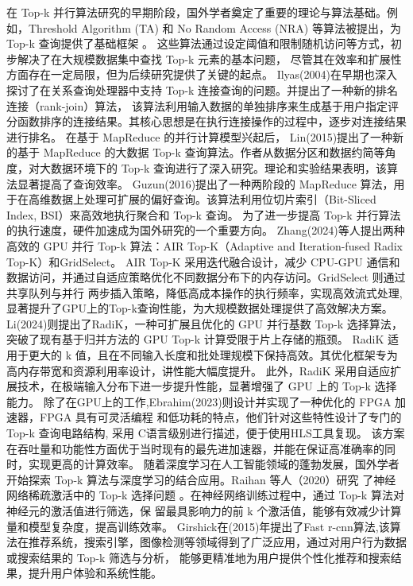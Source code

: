 在 Top-k 并行算法研究的早期阶段，国外学者奠定了重要的理论与算法基础。例如，Threshold Algorithm (TA) 和 No Random Access 
(NRA) 等算法被提出，为 Top-k 查询提供了基础框架 \cite {fagin2001optimal}。
这些算法通过设定阈值和限制随机访问等方式，初步解决了在大规模数据集中查找 Top-k 元素的基本问题，
尽管其在效率和扩展性方面存在一定局限，但为后续研究提供了关键的起点。
Ilyas(2004)在早期也深入探讨了在关系查询处理器中支持 Top-k 连接查询的问题\cite{ilyas2004supporting}。并提出了一种新的排名连接（rank-join）算法，
该算法利用输入数据的单独排序来生成基于用户指定评分函数排序的连接结果。其核心思想是在执行连接操作的过程中，逐步对连接结果进行排名。
在基于 MapReduce 的并行计算模型兴起后，
Lin(2015)提出了一种新的基于 MapReduce 的大数据 Top-k 查询算法\cite{lin2015top}。作者从数据分区和数据约简等角度，对大数据环境下的 Top-k 查询进行了深入研究。理论和实验结果表明，该算法显著提高了查询效率。
Guzun(2016)提出了一种两阶段的 MapReduce 算法\cite{guzun2016two}，用于在高维数据上处理可扩展的偏好查询。该算法利用位切片索引（Bit-Sliced Index, BSI）来高效地执行聚合和 Top-k 查询。
为了进一步提高 Top-k 并行算法的执行速度，硬件加速成为国外研究的一个重要方向。
Zhang(2024)等人提出两种高效的 GPU 并行 Top-k 算法：AIR Top-K（Adaptive and Iteration-fused Radix Top-K）和GridSelect\cite{zhang2023parallel}。
AIR Top-K 采用迭代融合设计，减少 CPU-GPU 通信和数据访问，并通过自适应策略优化不同数据分布下的内存访问。GridSelect 则通过共享队列与并行
两步插入策略，降低高成本操作的执行频率，实现高效流式处理,显著提升了GPU上的Top-k查询性能，为大规模数据处理提供了高效解决方案。
Li(2024)则提出了RadiK，一种可扩展且优化的 GPU 并行基数 Top-k 选择算法\cite{li2024radik}，突破了现有基于归并方法的 GPU Top-k 计算受限于片上存储的瓶颈。
RadiK 适用于更大的 k 值，且在不同输入长度和批处理规模下保持高效。其优化框架专为高内存带宽和资源利用率设计，讲性能大幅度提升。
此外，RadiK 采用自适应扩展技术，在极端输入分布下进一步提升性能，显著增强了 GPU 上的 Top-k 选择能力。
除了在GPU上的工作,Ebrahim(2023)则设计并实现了一种优化的 FPGA 加速器，FPGA 具有可灵活编程
和低功耗的特点，他们针对这些特性设计了专门的 Top-k 查询电路结构\cite{ebrahim2023finding}, 采用 C语言级别进行描述，便于使用HLS工具复现。
该方案在吞吐量和功能性方面优于当时现有的最先进加速器，并能在保证高准确率的同时，实现更高的计算效率。
随着深度学习在人工智能领域的蓬勃发展，国外学者开始探索 Top-k 算法与深度学习的结合应用。Raihan 等人（2020）研究
了神经网络稀疏激活中的 Top-k 选择问题 \cite {raihan2020sparse}。在神经网络训练过程中，通过 Top-k 算法对神经元的激活值进行筛选，保
留最具影响力的前 k 个激活值，能够有效减少计算量和模型复杂度，提高训练效率。
Girshick在(2015)年提出了Fast r-cnn算法,该算法在推荐系统，搜索引擎，图像检测等领域得到了广泛应用，通过对用户行为数据或搜索结果的 Top-k 筛选与分析，
能够更精准地为用户提供个性化推荐和搜索结果，提升用户体验和系统性能\cite{girshick2015fast}。


